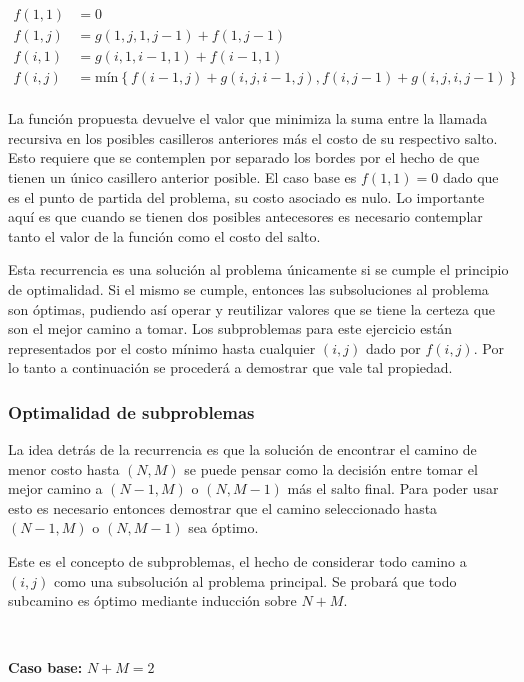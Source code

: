 	\begin{align*}
		f(1, 1) &= 0 \\
		f(1, j) &= g(1, j, 1, j - 1) + f(1, j - 1) \\
		f(i, 1) &= g(i, 1, i - 1, 1) + f(i - 1, 1) \\
		f(i, j) &= \text{mín}\left \{ f(i - 1, j) + g(i, j, i - 1, j), f(i, j - 1) + g(i, j, i, j - 1) \right \} \\
	\end{align*}

	La función propuesta devuelve el valor que minimiza la suma
	entre la llamada recursiva en los posibles casilleros anteriores más el
	costo de su respectivo salto. Esto requiere que se contemplen por separado
	los bordes por el hecho de que tienen un único casillero anterior posible.
	El caso base es $f(1, 1) = 0$ dado que es el punto de partida del
	problema, su costo asociado es nulo. Lo importante aquí es que cuando se tienen
	dos posibles antecesores es necesario contemplar tanto el valor de la
	función como el costo del salto.

	Esta recurrencia es una solución al problema únicamente si se cumple el principio
	de optimalidad. Si el mismo se cumple, entonces las subsoluciones al problema son
	óptimas, pudiendo así operar y reutilizar valores que se tiene la certeza
	que son el mejor camino a tomar. Los subproblemas para este ejercicio están
	representados por el costo mínimo hasta cualquier $(i, j)$ dado por $f(i,
	j)$. Por lo tanto a continuación se procederá a demostrar que vale tal
	propiedad.

	\subsubsection*{Optimalidad de subproblemas}

	La idea detrás de la recurrencia es que la solución de encontrar el camino
	de menor costo hasta $(N, M)$ se puede pensar como la decisión entre tomar
	el mejor camino a $(N - 1, M)$ o $(N, M - 1)$ más el salto final. Para poder
	usar esto es necesario entonces demostrar que el camino seleccionado hasta
	$(N - 1, M)$ o $(N, M - 1)$ sea óptimo.

	Este es el concepto de subproblemas, el hecho de considerar todo camino a
	$(i, j)$ como una subsolución al problema principal. Se probará que todo
	subcamino es óptimo mediante inducción sobre $N + M$.

	~

	\textbf{Caso base: } $N + M = 2$

